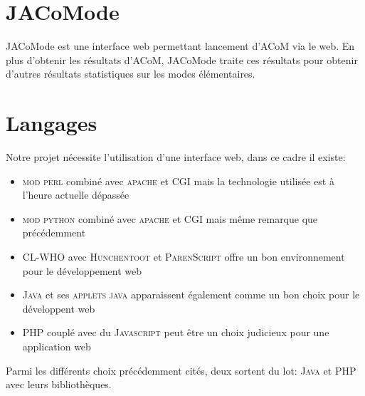 \section{JACoMode}
JACoMode est une interface web permettant lancement d'ACoM via le web. En plus d'obtenir les résultats d'ACoM, JACoMode traite ces résultats pour obtenir d'autres résultats statistiques sur les modes élémentaires.

\section{Langages}
Notre projet nécessite l'utilisation d'une interface web, dans ce cadre il existe:
\begin{itemize}
\item \textsc{mod perl} combiné avec \textsc{apache} et \textsc{CGI} mais la technologie utilisée est à l'heure actuelle dépassée
\item \textsc{mod python} combiné avec \textsc{apache} et \textsc{CGI} mais même remarque que précédemment
\item \textsc{CL-WHO} avec \textsc{Hunchentoot} et \textsc{ParenScript} offre un bon environnement pour le développement web
\item \textsc{Java} et ses \textsc{applets java} apparaissent également comme un bon choix pour le développent web
\item \textsc{PHP} couplé avec du \textsc{Javascript} peut être un choix judicieux pour une application web\\
\end{itemize}

Parmi les différents choix précédemment cités, deux sortent du lot: \textsc{Java} et \textsc{PHP} avec leurs bibliothèques.